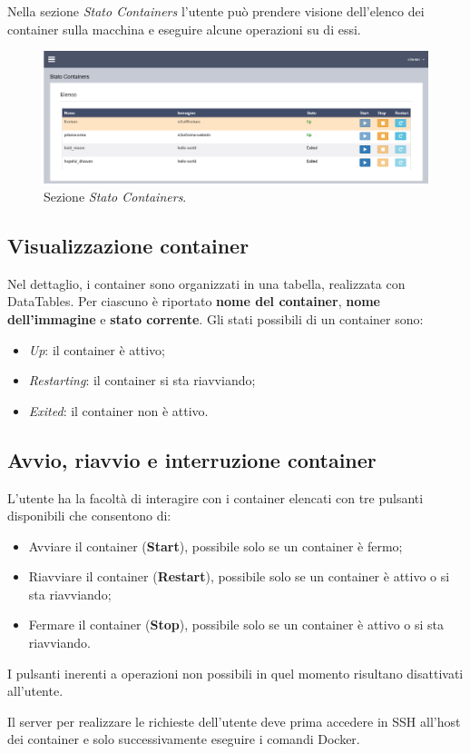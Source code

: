 Nella sezione \emph{Stato Containers} l'utente può prendere visione dell'elenco dei container sulla macchina e eseguire alcune operazioni su di essi.

\begin{figure}[H]
    \begin{center}
    \includegraphics[width=\textwidth]{images/full-containers.png}
    \caption{Sezione \emph{Stato Containers}.}
    \end{center}
\end{figure}

\subsection{Visualizzazione container}

Nel dettaglio, i container sono organizzati in una tabella, realizzata con DataTables. Per ciascuno è riportato \textbf{nome del container}, \textbf{nome dell'immagine} e \textbf{stato corrente}. Gli stati possibili di un container sono:
\begin{itemize}[noitemsep,nolistsep]
    \item \emph{Up}: il container è attivo;
    \item \emph{Restarting}: il container si sta riavviando;
    \item \emph{Exited}: il container non è attivo.
\end{itemize}

\subsection{Avvio, riavvio e interruzione container}

L'utente ha la facoltà di interagire con i container elencati con tre pulsanti disponibili che consentono di:
\begin{itemize}[noitemsep,nolistsep]
    \item Avviare il container (\textbf{Start}), possibile solo se un container è fermo;
    \item Riavviare il container (\textbf{Restart}), possibile solo se un container è attivo o si sta riavviando;
    \item Fermare il container (\textbf{Stop}), possibile solo se un container è attivo o si sta riavviando.
\end{itemize}

I pulsanti inerenti a operazioni non possibili in quel momento risultano disattivati all'utente.

Il server per realizzare le richieste dell'utente deve prima accedere in SSH all'host dei container e solo successivamente eseguire i comandi Docker.